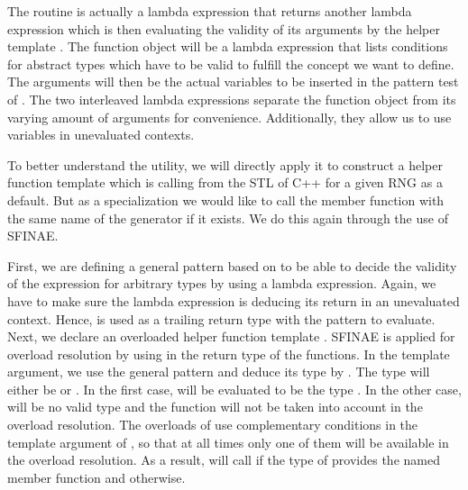 \documentclass{stdlocal}
\begin{document}
    The routine  is actually a lambda expression that returns another lambda expression which is then evaluating the validity of its arguments by the helper template .
    The function object  will be a lambda expression that lists conditions for abstract types which have to be valid to fulfill the concept we want to define.
    The arguments  will then be the actual variables to be inserted in the pattern test of .
    The two interleaved lambda expressions separate the function object  from its varying amount of arguments  for convenience.
    Additionally, they allow us to use variables in unevaluated contexts.

    To better understand the utility, we will directly apply it to construct a helper function template  which is calling  from the STL of C++ for a given RNG as a default.
    But as a specialization we would like to call the member function with the same name of the generator if it exists.
    We do this again through the use of SFINAE.

    First, we are defining a general pattern  based on  to be able to decide the validity of the expression  for arbitrary types by using a lambda expression.
    Again, we have to make sure the lambda expression is deducing its return in an unevaluated context.
    Hence,  is used as a trailing return type with the pattern to evaluate.
    Next, we declare an overloaded helper function template .
    SFINAE is applied for overload resolution by using  in the return type of the functions.
    In the template argument, we use the general pattern  and deduce its type by .
    The type will either be  or .
    In the first case,  will be evaluated to be the type .
    In the other case,  will be no valid type and the function will not be taken into account in the overload resolution.
    The overloads of  use complementary conditions in the template argument of , so that at all times only one of them will be available in the overload resolution.
    As a result,  will call  if the type of  provides the named member function and  otherwise.
\end{document}
